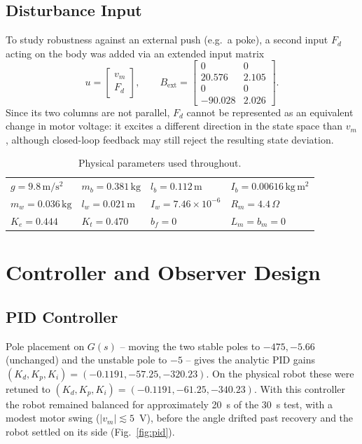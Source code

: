 \documentclass[conference]{IEEEtran}
\newcommand{\mat}[1]{\begin{bmatrix}#1\end{bmatrix}}
\begin{document}
\subsection{Disturbance Input}
To study robustness against an external push (e.g.\ a poke), a second input $F_d$ acting on the body was added via an extended input matrix
\begin{equation}
u=\mat{v_m\\F_d},\qquad
B_{\text{ext}}=\mat{0&0\\20.576&2.105\\0&0\\-90.028&2.026}.
\end{equation}
Since its two columns are not parallel, $F_d$ cannot be represented as an equivalent change in motor voltage: it excites a different direction in the state space than $v_m$, although closed-loop feedback may still reject the resulting state deviation.

\begin{table}[t]
\centering
\caption{Physical parameters used throughout.}
\label{tab:params}
\footnotesize
\setlength{\tabcolsep}{2pt}
\begin{tabular}{@{}llll@{}}
\toprule
$g=9.8\,\mathrm{m/s^2}$ & $m_b=0.381\,\mathrm{kg}$ & $l_b=0.112\,\mathrm{m}$ & $I_b=0.00616\,\mathrm{kg\,m^2}$\\
$m_w=0.036\,\mathrm{kg}$ & $l_w=0.021\,\mathrm{m}$ & $I_w=7.46\!\times\!10^{-6}$ & $R_m=4.4\,\Omega$\\
$K_e=0.444$ & $K_t=0.470$ & $b_f=0$ & $L_m=b_m=0$\\
\bottomrule
\end{tabular}
\end{table}

\section{Controller and Observer Design}\label{sec:design}
\subsection{PID Controller}
Pole placement on $G(s)$ -- moving the two stable poles to $-475,-5.66$ (unchanged) and the unstable pole to $-5$ -- gives the analytic PID gains $(K_d,K_p,K_i)=(-0.1191,-57.25,-320.23)$. On the physical robot these were retuned to $(K_d,K_p,K_i)=(-0.1191,-61.25,-340.23)$. With this controller the robot remained balanced for approximately 20~s of the 30~s test, with a modest motor swing ($|v_m|\lesssim5$~V), before the angle drifted past recovery and the robot settled on its side (Fig.~\ref{fig:pid}).
\end{document}
